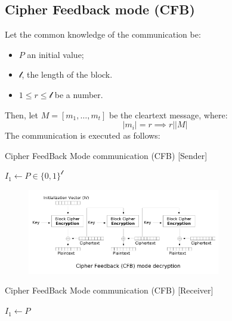 \subsection{Cipher Feedback mode (CFB)}
Let the common knowledge of the communication be:
\begin{itemize}
    \item $P$ an initial value;
    \item $\mathcal{l}$, the length of the block.
    \item $1 \leq r \leq \mathcal{l}$ be a number.
\end{itemize}
Then, let $M = [m_{1}, \dots, m_{t}]$ be the cleartext message, where:
\[|m_{i}| = r \implies r | |M| \]
The communication is executed as follows:
\begin{algorithm}
\caption{Cipher FeedBack Mode communication (CFB) [Sender]}\label{alg:CFB_sender}
$I_{1} \gets P \in \{0,1\}^{\mathcal{l}}$\;
\end{algorithm}

\begin{figure}[h]
    \centering
    \includegraphics[width=0.75\textwidth]{img/CFB.png}
\end{figure}

\begin{algorithm}
\caption{Cipher FeedBack Mode communication (CFB) [Receiver]}\label{alg:CFB_receiver}
$I_{1} \gets P $\;
\end{algorithm}


